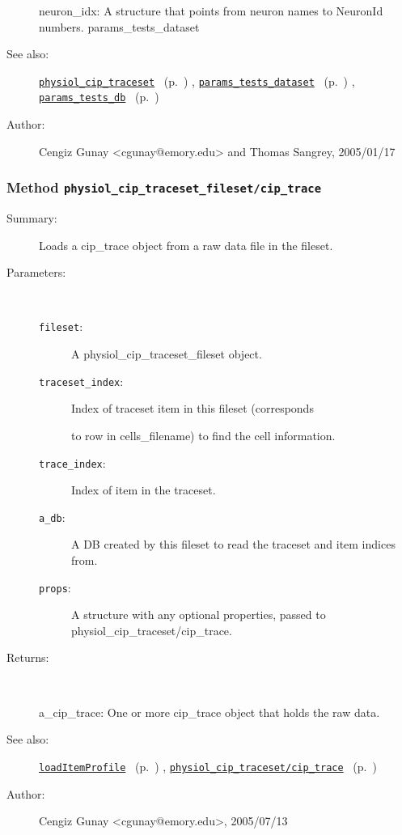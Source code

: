 \begin{description}
	neuron\_idx: A structure that points from neuron names to NeuronId numbers.
	params\_tests\_dataset
%
%
\item[See also:]%
\hyperlink{ref_physiol_cip_traceset}{\texttt{physiol\_cip\_traceset}}%
\ (p.~\pageref{ref_physiol_cip_traceset})%
%
, \hyperlink{ref_params_tests_dataset}{\texttt{params\_tests\_dataset}}%
\ (p.~\pageref{ref_params_tests_dataset})%
%
, \hyperlink{ref_params_tests_db}{\texttt{params\_tests\_db}}%
\ (p.~\pageref{ref_params_tests_db})%
%
%
\item[Author:]%
Cengiz Gunay <cgunay@emory.edu> and Thomas Sangrey, 2005/01/17
%
\end{description}
\methodline%
\subsubsection[Method \texttt{cip\_trace}]{Method \texttt{physiol\_cip\_traceset\_fileset/cip\_trace}}%
%
\label{ref_physiol_cip_traceset_fileset__cip_trace}%
\hypertarget{ref_physiol_cip_traceset_fileset__cip_trace}{}%
\begin{description}
\item[Summary:]Loads a cip\_trace object from a raw data file in the fileset.
%
%
%
\item[Parameters:]~
\begin{description}%
\item[\texttt{fileset}:]
 A physiol\_cip\_traceset\_fileset object.
\item[\texttt{traceset\_index}:]
 Index of traceset item in this fileset (corresponds 

to row in cells\_filename) to find the cell information.
\item[\texttt{trace\_index}:]
 Index of item in the traceset.
\item[\texttt{a\_db}:]
 A DB created by this fileset to read the traceset and item indices from.
\item[\texttt{props}:]
 A structure with any optional properties, passed to physiol\_cip\_traceset/cip\_trace.
\end{description}%
%
\item[Returns:
]~

	a\_cip\_trace: One or more cip\_trace object that holds the raw data.
%
%
\item[See also:]%
\hyperlink{ref_loadItemProfile}{\texttt{loadItemProfile}}%
\ (p.~\pageref{ref_loadItemProfile})%
%
, \hyperlink{ref_physiol_cip_traceset__cip_trace}{\texttt{physiol\_cip\_traceset/cip\_trace}}%
\ (p.~\pageref{ref_physiol_cip_traceset__cip_trace})%
%
%
\item[Author:]%
Cengiz Gunay <cgunay@emory.edu>, 2005/07/13
%
\end{description}
\methodline%
